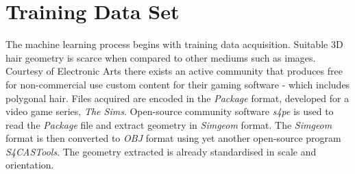 \documentclass[ %
author={Dillon Keith Diep},
supervisor={Dr. Carl Henrik Ek},
degree={MEng},
title={ART-CG:},
subtitle={Assisted Real-time Content Generation of 3D Hair by Learning Manifolds},
type={Research},
year={2017} ]{dissertation}
\begin{document}
\section{Training Data Set}
The machine learning process begins with training data acquisition. Suitable 3D hair geometry is scarce when compared to other mediums such as images. Courtesy of Electronic Arts there exists an active community that produces free for non-commercial use custom content for their gaming software - which includes polygonal hair\cite{tsr}. Files acquired are encoded in the \textit{Package} format, developed for a video game series, \textit{The Sims}. Open-source community software \textit{s4pe} is used to read the \textit{Package} file and extract geometry in \textit{Simgeom} format\cite{s4pe}. The \textit{Simgeom} format is then converted to \textit{OBJ} format using yet another open-source program \textit{S4CASTools}\cite{s4cas}. The geometry extracted is already standardised in scale and orientation.
\end{document}
